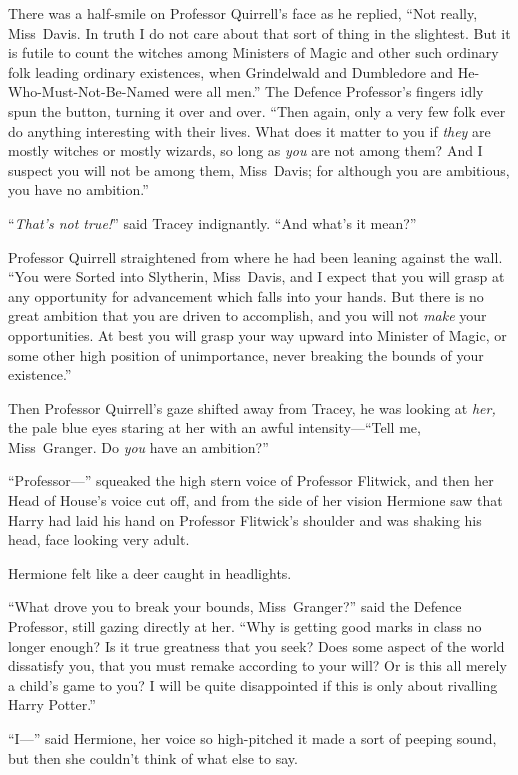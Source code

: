 There was a half-smile on Professor Quirrell’s face as he replied, “Not really, Miss~Davis. In truth I do not care about that sort of thing in the slightest. But it is futile to count the witches among Ministers of Magic and other such ordinary folk leading ordinary existences, when Grindelwald and Dumbledore and He-Who-Must-Not-Be-Named were all men.” The Defence Professor’s fingers idly spun the button, turning it over and over. “Then again, only a very few folk ever do anything interesting with their lives. What does it matter to you if \emph{they} are mostly witches or mostly wizards, so long as \emph{you} are not among them? And I suspect you will not be among them, Miss~Davis; for although you are ambitious, you have no ambition.”

“\emph{That’s not true!}” said Tracey indignantly. “And what’s it mean?”

Professor Quirrell straightened from where he had been leaning against the wall. “You were Sorted into Slytherin, Miss~Davis, and I expect that you will grasp at any opportunity for advancement which falls into your hands. But there is no great ambition that you are driven to accomplish, and you will not \emph{make} your opportunities. At best you will grasp your way upward into Minister of Magic, or some other high position of unimportance, never breaking the bounds of your existence.”

Then Professor Quirrell’s gaze shifted away from Tracey, he was looking at \emph{her,} the pale blue eyes staring at her with an awful intensity—“Tell me, Miss~Granger. Do \emph{you} have an ambition?”

“Professor—” squeaked the high stern voice of Professor Flitwick, and then her Head of House’s voice cut off, and from the side of her vision Hermione saw that Harry had laid his hand on Professor Flitwick’s shoulder and was shaking his head, face looking very adult.

Hermione felt like a deer caught in headlights.

“What drove you to break your bounds, Miss~Granger?” said the Defence Professor, still gazing directly at her. “Why is getting good marks in class no longer enough? Is it true greatness that you seek? Does some aspect of the world dissatisfy you, that you must remake according to your will? Or is this all merely a child’s game to you? I will be quite disappointed if this is only about rivalling Harry Potter.”

“I—” said Hermione, her voice so high-pitched it made a sort of peeping sound, but then she couldn’t think of what else to say.

